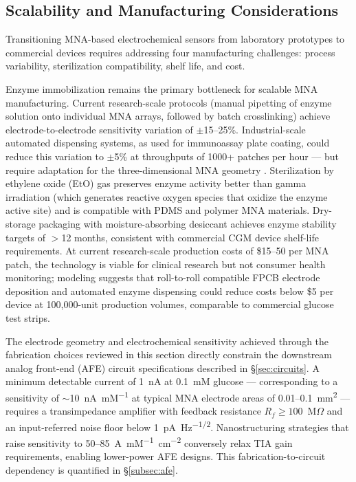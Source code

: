 \documentclass[review,1p]{elsarticle}
\begin{document}
\subsection{Scalability and Manufacturing Considerations}
\label{subsec:scalability}

Transitioning MNA-based electrochemical sensors from laboratory prototypes to commercial devices requires addressing four manufacturing challenges: process variability, sterilization compatibility, shelf life, and cost.

Enzyme immobilization remains the primary bottleneck for scalable MNA manufacturing. Current research-scale protocols (manual pipetting of enzyme solution onto individual MNA arrays, followed by batch crosslinking) achieve electrode-to-electrode sensitivity variation of $\pm$15--25\%. Industrial-scale automated dispensing systems, as used for immunoassay plate coating, could reduce this variation to $\pm$5\% at throughputs of 1000+ patches per hour — but require adaptation for the three-dimensional MNA geometry \cite{Friedel2023}. Sterilization by ethylene oxide (EtO) gas preserves enzyme activity better than gamma irradiation (which generates reactive oxygen species that oxidize the enzyme active site) and is compatible with PDMS and polymer MNA materials. Dry-storage packaging with moisture-absorbing desiccant achieves enzyme stability targets of $>$12 months, consistent with commercial CGM device shelf-life requirements. At current research-scale production costs of \$15--50 per MNA patch, the technology is viable for clinical research but not consumer health monitoring; modeling suggests that roll-to-roll compatible FPCB electrode deposition and automated enzyme dispensing could reduce costs below \$5 per device at 100,000-unit production volumes, comparable to commercial glucose test strips.

The electrode geometry and electrochemical sensitivity achieved through the fabrication choices reviewed in this section directly constrain the downstream analog front-end (AFE) circuit specifications described in \S\ref{sec:circuits}. A minimum detectable current of 1~nA at 0.1~mM glucose — corresponding to a sensitivity of $\sim$10~nA~mM\textsuperscript{$-1$} at typical MNA electrode areas of 0.01--0.1~mm\textsuperscript{2} — requires a transimpedance amplifier with feedback resistance $R_f \geq 100$~M$\Omega$ and an input-referred noise floor below 1~pA~Hz\textsuperscript{$-1/2$}. Nanostructuring strategies that raise sensitivity to 50--85~\textmu{}A~mM\textsuperscript{$-1$}~cm\textsuperscript{$-2$} conversely relax TIA gain requirements, enabling lower-power AFE designs. This fabrication-to-circuit dependency is quantified in \S\ref{subsec:afe}.
\end{document}
